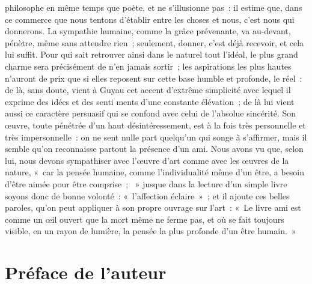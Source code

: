 \documentclass[french,twoside]{book} %
\newcommand{\byline}[1]{\bigskip{\RaggedLeft{#1}\par}\bigskip}
\begin{document}
philosophe en même temps que poète, et ne s’illusionne pas : il estime que, dans ce commerce que nous tentons d’établir entre les choses et nous, c’est nous qui donnerons. La sympathie humaine, comme la grâce prévenante, va au-devant, pénètre, même sans attendre rien ; seulement, donner, c’est déjà recevoir, et cela lui suffit. Pour qui sait retrouver ainsi dans le naturel tout l’idéal, le plus grand charme sera précisément de n’en jamais sortir ; les aspirations les plus hautes n’auront de prix que si elles reposent sur cette base humble et profonde, le réel : de là, sans doute, vient à Guyau cet accent d’extrême simplicité avec lequel il exprime des idées et des senti ments d’une constante élévation ; de là lui vient aussi ce caractère persuasif qui se confond avec celui de l’absolue sincérité. Son œuvre, toute pénétrée d’un haut désintéressement, est à la fois très personnelle et très impersonnelle : on ne sent nulle part quelqu’un qui songe à s’affirmer, mais il semble qu’on reconnaisse partout la présence d’un ami. Nous avons vu que, selon lui, nous devons sympathiser avec l’œuvre d’art comme avec les œuvres de la nature, « car la pensée humaine, comme l’individualité même d’un être, a besoin d’être aimée pour être comprise ;  » jusque dans la lecture d’un simple livre soyons donc de bonne volonté : « l’affection éclaire » ; et il ajoute ces belles paroles, qu’on peut appliquer à son propre ouvrage sur l’art : « Le livre ami est comme un œil ouvert que la mort même ne ferme pas, et où se fait toujours visible, en un rayon de lumière, la pensée la plus profonde d’un être humain. »\par

\byline{ Alfred Fouillée }
\section[{Préface de l’auteur}]{Préface de l’auteur}\renewcommand{\leftmark}{Préface de l’auteur}
\end{document}
